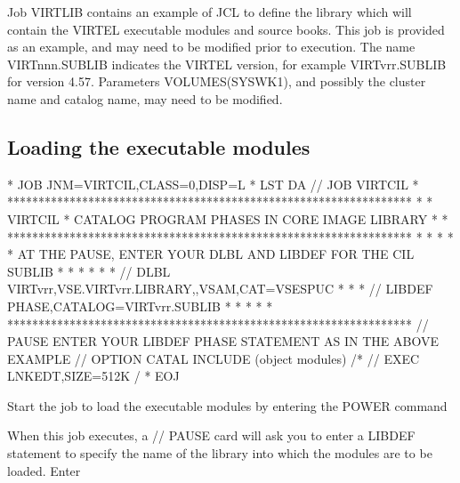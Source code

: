 \documentclass[letterpaper,10pt,english]{sphinxmanual}
\begin{document}
Job VIRTLIB contains an example of JCL to define the library which will contain the VIRTEL executable modules and source books. This job is provided as an example, and may need to be modified prior to execution. The name VIRTnnn.SUBLIB indicates the VIRTEL version, for example VIRTvrr.SUBLIB for version 4.57. Parameters VOLUMES(SYSWK1), and possibly the cluster name and catalog name, may need to be modified.


\subsection{Loading the executable modules}
\label{\detokenize{Installation_Guide:loading-the-executable-modules}}
\begin{sphinxVerbatim}[commandchars=\\\{\}]
* \PYGZdl{}\PYGZdl{} JOB JNM=VIRTCIL,CLASS=0,DISP=L
* \PYGZdl{}\PYGZdl{} LST DA
// JOB VIRTCIL
* *****************************************************************
* * VIRTCIL * CATALOG PROGRAM PHASES IN CORE IMAGE LIBRARY        *
* *****************************************************************
* *                                                               *
* * AT THE PAUSE, ENTER YOUR DLBL AND LIBDEF FOR THE CIL SUBLIB   *
* *                                                               *
* * // DLBL VIRTvrr,\PYGZsq{}VSE.VIRTvrr.LIBRARY\PYGZsq{},,VSAM,CAT=VSESPUC       *
* * // LIBDEF PHASE,CATALOG=VIRTvrr.SUBLIB                        *
* *                                                               *
* *****************************************************************
// PAUSE ENTER YOUR LIBDEF PHASE STATEMENT AS IN THE ABOVE EXAMPLE
// OPTION CATAL
        INCLUDE
        (object modules)
/*
// EXEC LNKEDT,SIZE=512K
/\PYGZam{}
* \PYGZdl{}\PYGZdl{} EOJ
\end{sphinxVerbatim}


Start the job to load the executable modules by entering the POWER command

\begin{sphinxVerbatim}[commandchars=\\\{\}]
 
\end{sphinxVerbatim}

When this job executes, a // PAUSE card will ask you to enter a LIBDEF statement to specify the name of the library into which the modules are to be loaded. Enter
\end{document}
